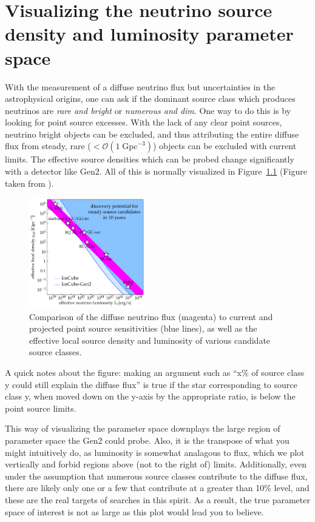\chapter{Visualizing the neutrino source density and luminosity parameter space}
\label{sec:density_lumi_rotate}

With the measurement of a diffuse neutrino flux but uncertainties in the astrophysical origins, one can ask if the dominant source class which produces neutrinos are \textit{rare and bright} or \textit{numerous and dim}. One way to do this is by looking for point source excesses. With the lack of any clear point sources, neutrino bright objects can be excluded, and thus attributing the entire diffuse flux from steady, rare ($<\mathcal{O}(1\; \mathrm{Gpc}^{-3})$) objects can be excluded with current limits. The effective source densities which can be probed change significantly with a detector like Gen2. All of this is normally visualized in Figure~\ref{fig:rotate_current_fig} (Figure taken from \cite{Aartsen:2019swn}).

\begin{figure}[h!]
    \centering
    \includegraphics[width=0.45\textwidth]{figures/rotated_phase_space/continuous_Gen2_revised.pdf}
    \caption[Original density luminosity plane]{Comparison of the diffuse neutrino flux (magenta) to current and projected point source sensitivities (blue lines), as well as the effective local source density and luminosity of various candidate source classes.}
    \label{fig:rotate_current_fig}
\end{figure}

A quick notes about the figure: making an argument such as ``x\% of source class y could still explain the diffuse flux'' is true if the star corresponding to source class y, when moved down on the y-axis by the appropriate ratio, is below the point source limits.

This way of visualizing the parameter space downplays the large region of parameter space the Gen2 could probe. Also, it is the transpose of what you might intuitively do, as luminosity is somewhat analagous to flux, which we plot vertically and forbid regions above (not to the right of) limits. Additionally, even under the assumption that numerous source classes contribute to the diffuse flux, there are likely only one or a few that contribute at a greater than 10\% level, and these are the real targets of searches in this spirit. As a result, the true parameter space of interest is not as large as this plot would lead you to believe. 

